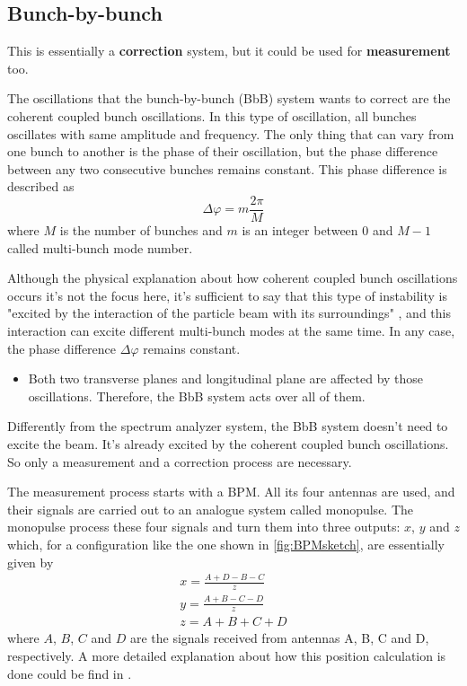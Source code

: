 \subsection{Bunch-by-bunch}
This is essentially a \textbf{correction} system, but it could be used for \textbf{measurement} too.

The oscillations that the bunch-by-bunch (BbB) system wants to correct are the coherent coupled bunch oscillations. In this type of oscillation, all bunches oscillates with same amplitude and frequency. The only thing that can vary from one bunch to another is the phase of their oscillation, but the phase difference between any two consecutive bunches remains constant. This phase difference is described as
\begin{equation}
	\Delta \varphi = m \frac{2\pi}{M}
\end{equation}
where $M$ is the number of bunches and $m$ is an integer between 0 and $M-1$ called multi-bunch mode number.

Although the physical explanation about how coherent coupled bunch oscillations occurs it's not the focus here, it's sufficient to say that this type of instability is "excited by the interaction of the particle beam with its surroundings" \cite{lonza}, and this interaction can excite different multi-bunch modes at the same time. In any case, the phase difference $\Delta \varphi$ remains constant.

\begin{itemize}
	\item Both two transverse planes and longitudinal plane are affected by those oscillations. Therefore, the BbB system acts over all of them.
\end{itemize}

Differently from the spectrum analyzer system, the BbB system doesn't need to excite the beam. It's already excited by the coherent coupled bunch oscillations. So only a measurement and a correction process are necessary.

The measurement process starts with a BPM. All its four antennas are used, and their signals are carried out to an analogue system called monopulse. The monopulse process these four signals and turn them into three outputs: $x$, $y$ and $z$ which, for a configuration like the one shown in \autoref{fig:BPMsketch}, are essentially given by
\begin{align}
	x = \frac{A+D-B-C}{z}\\
	y = \frac{A+B-C-D}{z}\\
	z = A+B+C+D
\end{align}
where $A$, $B$, $C$ and $D$ are the signals received from antennas A, B, C and D, respectively. A more detailed explanation about how this position calculation is done could be find in \cite{digBPMCalculation}.

